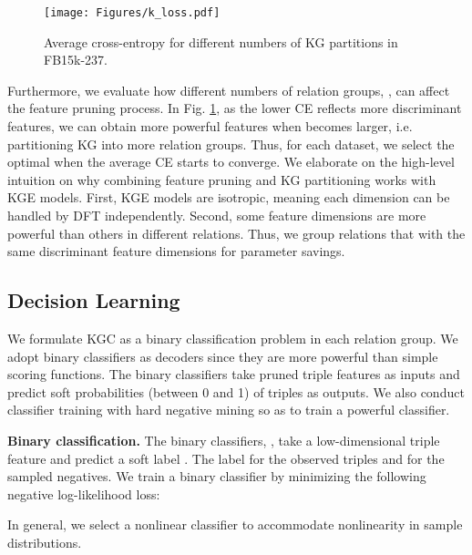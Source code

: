 \documentclass{article}
\begin{document}
\begin{figure}[t]
\centering
\texttt{[image: Figures/k\_loss.pdf]} \\
\caption{Average cross-entropy for different numbers of KG partitions
in FB15k-237.}\label{fig:avg_ce}
\end{figure}


Furthermore, we evaluate how different numbers of relation groups, , can affect the feature 
pruning process. In Fig. \ref{fig:avg_ce}, as the lower CE reflects more 
discriminant features, we can obtain more powerful features when  becomes larger, i.e. 
partitioning KG into more relation groups. 
Thus, for each dataset, we select the optimal  when the average CE starts to converge. We 
elaborate on the high-level intuition on why combining feature pruning and KG partitioning 
works with KGE models. First, KGE models are isotropic, meaning each dimension can be handled 
by DFT independently. Second, some feature dimensions are more powerful than others in 
different relations. Thus, we group relations that with the same discriminant feature 
dimensions for parameter savings.



\subsection{Decision Learning}\label{subsec:decision}

We formulate KGC as a binary classification problem in each
relation group. We adopt binary classifiers as decoders since they are
more powerful than simple scoring functions. The binary
classifiers take pruned triple features as inputs and predict
soft probabilities (between 0 and 1) of triples as outputs. We also
conduct classifier training with hard negative mining so as to train a
powerful classifier. 

\textbf{Binary classification.} The binary classifiers, , take a
low-dimensional triple feature  and predict a soft label
. The label  for the observed triples and 
for the sampled negatives. We train a binary classifier by minimizing the following
negative log-likelihood loss:

In general, we select a nonlinear classifier to accommodate 
nonlinearity in sample distributions. 
\end{document}
